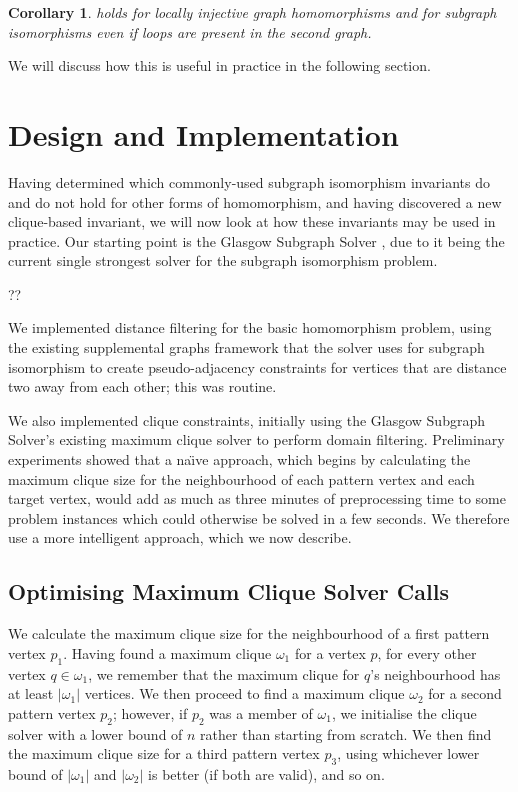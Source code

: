 \documentclass{article}
\newtheorem{corollary}{Corollary}
\begin{document}
\begin{corollary} holds for locally injective graph homomorphisms and for
    subgraph isomorphisms even if loops are present in the second graph.
\end{corollary}

We will discuss how this is useful in practice in the following section.

\section{Design and Implementation}

Having determined which commonly-used subgraph isomorphism invariants do and do not hold for other
forms of homomorphism, and having discovered a new clique-based invariant, we will now look at how
these invariants may be used in practice. Our starting point is the Glasgow Subgraph Solver
\cite{DBLP:conf/gg/McCreeshP020}, due to it being the current single strongest solver for the
subgraph isomorphism problem.

??

We implemented distance filtering for the basic homomorphism problem, using
the existing supplemental graphs framework that the solver uses for subgraph isomorphism to create
pseudo-adjacency constraints for vertices that are distance two away from each other; this was
routine.

We also implemented clique constraints, initially using the Glasgow Subgraph Solver's existing
maximum clique solver to perform domain filtering. Preliminary experiments showed that a na{\"\i}ve
approach, which begins by calculating the maximum clique size for the neighbourhood of each pattern
vertex and each target vertex, would add as much as three minutes of preprocessing time to some
problem instances which could otherwise be solved in a few seconds. We therefore use a more
intelligent approach, which we now describe.

\subsection{Optimising Maximum Clique Solver Calls}

We calculate the maximum clique size for the neighbourhood of a first pattern vertex $p_1$.  Having
found a maximum clique $\omega_1$ for a vertex $p$, for every other vertex $q \in \omega_1$, we
remember that the maximum clique for $q$'s neighbourhood has at least $|\omega_1|$ vertices. We then
proceed to find a maximum clique $\omega_2$ for a second pattern vertex $p_2$; however, if $p_2$ was
a member of $\omega_1$, we initialise the clique solver with a lower bound of $n$ rather than
starting from scratch. We then find the maximum clique size for a third pattern vertex $p_3$, using
whichever lower bound of $|\omega_1|$ and $|\omega_2|$ is better (if both are valid), and so on.
\end{document}
